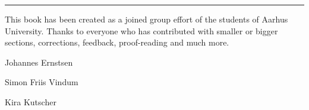 \vspace{0.7em}
\noindent\hfil\rule{0.8\textwidth}{.4pt}\hfil

\vspace{2em}
\noindent This book has been created as a joined group effort of the students of Aarhus University. Thanks to everyone who has contributed with smaller or bigger sections, corrections, feedback, proof-reading and much more.

\begin{multicols}{2}
  Johannes Ernstsen

  Simon Friis Vindum
  
  \hfill
  \columnbreak
  
  Kira Kutscher
\end{multicols}

